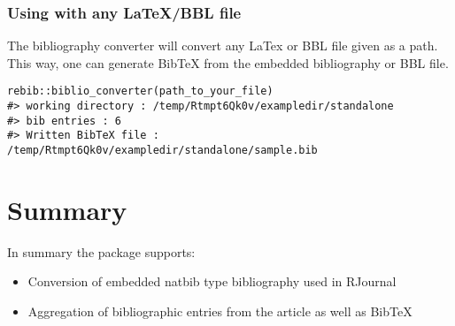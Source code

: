 \subsubsection{Using with any LaTeX/BBL file}
The bibliography converter will convert any LaTex or BBL file given as a path. This way, one can generate BibTeX from the embedded bibliography or BBL file.
\begin{verbatim}
rebib::biblio_converter(path_to_your_file)
#> working directory : /temp/Rtmpt6Qk0v/exampledir/standalone
#> bib entries : 6
#> Written BibTeX file : /temp/Rtmpt6Qk0v/exampledir/standalone/sample.bib
\end{verbatim}

\section{Summary}

In summary the  package supports:
\begin{itemize}
\item Conversion of embedded natbib type bibliography used in RJournal
\item Aggregation of bibliographic entries from the article as well as BibTeX
\end{itemize}


\address{%
Abhishek Ulayil\\
Student, Institute of Actuaries of India\\%
Mumbai, India\\
ORCiD: 0009-0000-6935-8690\\
}
